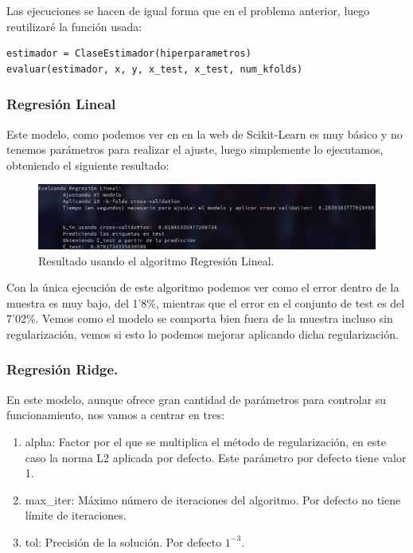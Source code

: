 \documentclass[12pt, spanish]{article}
\begin{document}
Las ejecuciones se hacen de igual forma que en el problema anterior, luego reutilizaré la función usada:

\begin{lstlisting}
estimador = ClaseEstimador(hiperparametros)
evaluar(estimador, x, y, x_test, x_test, num_kfolds)
\end{lstlisting}


\subsubsection{Regresión Lineal}

Este modelo, como podemos ver en en la web de Scikit-Learn\cite{linearReg} es muy básico y no tenemos parámetros para realizar el ajuste, luego simplemente lo ejecutamos, obteniendo el siguiente resultado:


\begin{figure}[H]
	\centering
	\includegraphics[scale=0.45]{regresion/regLin.png}
	\caption{Resultado usando el algoritmo Regresión Lineal.}
	\label{ridge0}
\end{figure}


Con la única ejecución de este algoritmo podemos ver como el error dentro de la muestra es muy bajo, del 1'8\%, mientras que el error en el conjunto de test es del 7'02\%. Vemos como el modelo se comporta bien fuera de la muestra incluso sin regularización, vemos si esto lo podemos mejorar aplicando dicha regularización.

\newpage

\subsubsection{Regresión Ridge.}

En este modelo, aunque ofrece gran cantidad de parámetros para controlar su funcionamiento, nos vamos a centrar en tres:

\begin{enumerate}
	\item alpha: Factor por el que se multiplica el método de regularización, en este caso la norma L2 aplicada por defecto. Este parámetro por defecto tiene valor 1.
	\item max\_iter: Máximo número de iteraciones del algoritmo. Por defecto no tiene límite de iteraciones.
	\item tol: Precisión de la solución. Por defecto $1^{-3}$.
\end{enumerate}
\end{document}
